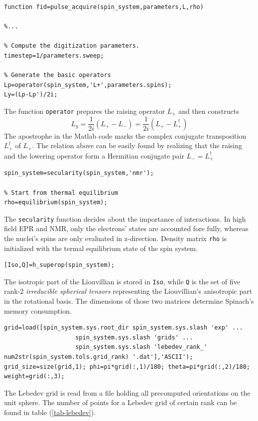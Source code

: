 \documentclass[11.5pt,a4paper]{article}
\begin{document}
\begin{lstlisting}
function fid=pulse_acquire(spin_system,parameters,L,rho)

%...

% Compute the digitization parameters.
timestep=1/parameters.sweep;

% Generate the basic operators
Lp=operator(spin_system,'L+',parameters.spins);
Ly=(Lp-Lp')/2i;
\end{lstlisting}
The function \verb$operator$ prepares the raising operator $L_+$ and then constructs
\begin{equation}
  L_y = \frac{1}{2i} ( L_+ - L_- ) = \frac{1}{2i} ( L_+ - L_+^\dagger )
\end{equation}
The apostrophe in the Matlab code marks the complex conjugate transposition $L_+^\dagger$ of $L_+$. The relation above can be easily found by realizing that the raising and the lowering operator form a Hermitian conjugate pair $L_- = L_+^\dagger$

\begin{lstlisting}[firstnumber=last]
% Set the secularity assumptions
spin_system=secularity(spin_system,'nmr');

% Start from thermal equilibrium
rho=equilibrium(spin_system);
\end{lstlisting}
The \verb$secularity$ function decides about the importance of interactions. In high field EPR and NMR, only the electrons' states are accounted fore fully, whereas the nuclei's spins are only evaluated in z-direction. Density matrix \verb$rho$ is initialized with the termal equilibrium state of the spin system.

\begin{lstlisting}[firstnumber=last]
[Iso,Q]=h_superop(spin_system);
\end{lstlisting}

The isotropic part of the Liouvillian is stored in \verb$Iso$, while \verb$Q$ is the set of five rank-2 \emph{irreducible spherical tensors} representing the Liouvillian's anisotropic part in the rotational basis. The dimensions of those two matrices determine Spinach's memory consumption.

\begin{lstlisting}[firstnumber=last]
% Get the spherical averaging grid
grid=load([spin_system.sys.root_dir spin_system.sys.slash 'exp' ...
				    spin_system.sys.slash 'grids' ...
				    spin_system.sys.slash 'lebedev_rank_' num2str(spin_system.tols.grid_rank) '.dat'],'ASCII');
grid_size=size(grid,1); phi=pi*grid(:,1)/180; theta=pi*grid(:,2)/180; weight=grid(:,3);
\end{lstlisting}
The Lebedev grid is read from a file holding all precomputed orientations on the unit sphere. The number of points for a Lebedev grid of certain rank can be found in table (\ref{tab-lebedev}).
\end{document}
